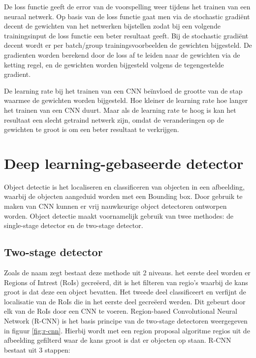 De loss functie geeft de error van de voorspelling weer tijdens het trainen van een neuraal netwerk. 
Op basis van de loss functie gaat men via de stochastic gradi\"ent decent de gewichten van het netwerken bijstellen zodat bij een volgende trainingsinput de loss functie een beter resultaat geeft. 
Bij de stochastic gradi\"ent decent wordt er per batch/group trainingsvoorbeelden de gewichten bijgesteld. 
De gradienten worden berekend door de loss af te leiden naar de gewichten via de ketting regel, en de gewichten worden bijgesteld volgens de tegengestelde gradient. 

De learning rate bij het trainen van een CNN be\"invloed de grootte van de stap waarmee de gewichten worden bijgesteld.
Hoe kleiner de learning rate hoe langer het trainen van een CNN duurt.
Maar als de learning rate te hoog is kan het resultaat een slecht getraind netwerk zijn, omdat de veranderingen op de gewichten te groot is om een beter resultaat te verkrijgen.


\section{Deep learning-gebaseerde detector}
Object detectie is het localiseren en classificeren van objecten in een afbeelding, waarbij de objecten aangeduid worden met een Bounding box. 
Door gebruik te maken van CNN kunnen er vrij nauwkeurige object detectoren ontworpen worden. 
Object detectie maakt voornamelijk gebruik van twee methodes: de single-stage detector en de two-stage detector.

\subsection{Two-stage detector}
Zoals de naam zegt bestaat deze methode uit 2 niveaus. 
het eerste deel worden er Regions of Intrest (RoIs) gecre\"eerd, dit is het filteren van regio's waarbij de kans groot is dat deze een object bevatten. 
Het tweede deel classificeert en verfijnt de localisatie van de RoIs die in het eerste deel gecre\"eerd werden. 
Dit gebeurt door elk van de RoIs door een CNN te voeren. 
Region-based Convolutional Neural Network (R-CNN) is het basis principe van de two-stage detectoren weergegeven in figuur \ref{fig:r-cnn}. 
Hierbij wordt met een region proposal algoritme regios uit de afbeelding gefilterd waar de kans groot is dat er objecten op staan.
R-CNN bestaat uit 3 stappen:
 
